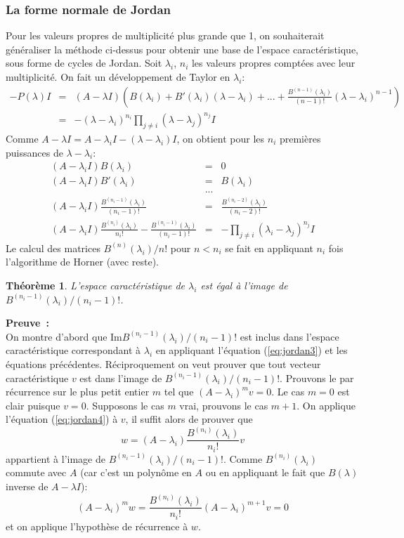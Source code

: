 \documentclass[a4paper,11pt]{article}
\newtheorem{thm}{Théorème}
\begin{document}
\begin{giacjshere}
\subsubsection{La forme normale de Jordan} \label{sec:jordan}
Pour les valeurs propres de multiplicit\'e plus grande que 1, on souhaiterait 
g\'en\'eraliser la m\'ethode ci-dessus pour obtenir une base
de l'espace caractéristique, sous forme de cycles de Jordan.
Soit $\lambda _i$, $n_i$ les valeurs propres compt\'ees avec leur 
multiplicit\'e. On fait un d\'eveloppement de Taylor en
$\lambda _i$:
\begin{eqnarray*} 
-P(\lambda )I&=&(A-\lambda I)\left(
B(\lambda_i )+ B'(\lambda _i)(\lambda -\lambda _i)
+ ... +  \frac{B^{(n-1)}(\lambda_i )}{(n-1)!} 
(\lambda -\lambda _i)^{n-1} \right) \\
&=& -(\lambda -\lambda _i)^{n_i}
\prod _{j\neq i} (\lambda -\lambda _j)^{n_j} I 
\end{eqnarray*}
Comme $A-\lambda I=A-\lambda _i I - (\lambda -\lambda _i)I$, on obtient
pour les $n_i$ premi\`eres puissances de $\lambda -\lambda _i$:
\begin{eqnarray} \label{eq:jordan1}
(A-\lambda _i I) B(\lambda _i)&=&0\\
(A-\lambda _i I) B'(\lambda _i)&=&B(\lambda_i )\\
& ... & \\
(A-\lambda _i I) \frac{B^{(n_i-1)}(\lambda _i)}{(n_i-1)!} &=& 
\frac{B^{(n_i-2)}(\lambda _i)}{(n_i-2)!} \label{eq:jordan3} \\
(A-\lambda _i I)\frac{B^{(n_i)}(\lambda_i)}{n_i!} -  
\frac{B^{(n_i-1)}(\lambda_i)}{(n_i-1)!}
&= &-\prod_{j\neq i}(\lambda _i-\lambda _j)^{n_j} I \label{eq:jordan4}
\end{eqnarray}
Le calcul des matrices $B^{(n)}(\lambda _i)/n!$ pour $n<n_i$ se fait en
appliquant $n_i$ fois l'algorithme de Horner (avec reste).

\begin{thm} \label{th:jordan}
L'espace caract\'eristique de $\lambda _i$ est égal à
l'image de $B^{(n_i-1)}(\lambda _i)/(n_i-1)!$.
\end{thm}
{\bf Preuve~:}\\
On montre d'abord que Im$B^{(n_i-1)}(\lambda _i)/(n_i-1)!$ est inclus
dans l'espace caractéristique correspondant à $\lambda_i$ en
appliquant l'\'equation (\ref{eq:jordan3}) et les \'equations précédentes.
Réciproquement on veut prouver que tout vecteur caract\'eristique $v$ est dans 
l'image de $B^{(n_i-1)}(\lambda _i)/(n_i-1)!$. Prouvons le par r\'ecurrence
sur le plus petit entier $m$ tel que
$(A-\lambda _i)^{m}v=0$. Le cas $m=0$ est clair puisque $v=0$.
Supposons le cas $m$ vrai, prouvons le cas $m+1$. On applique l'\'equation
(\ref{eq:jordan4}) \`a $v$, il suffit alors de prouver que
\[ w=(A-\lambda _i)\frac{B^{(n_i)}(\lambda_i)}{n_i!} v\]
appartient \`a l'image de
$B^{(n_i-1)}(\lambda _i)/(n_i-1)!$.
Comme $B^{(n_i)}(\lambda_i)$
commute avec $A$ (car c'est un polyn\^ome en $A$ ou en appliquant
le fait que $B(\lambda)$ inverse de $A-\lambda I$):
\[ (A-\lambda _i)^m w=\frac{B^{(n_i)}(\lambda_i)}{n_i!} 
(A-\lambda _i)^{m+1}v=0 \]
et on applique l'hypoth\`ese de r\'ecurrence \`a $w$.


\end{giacjshere}
\end{document}
